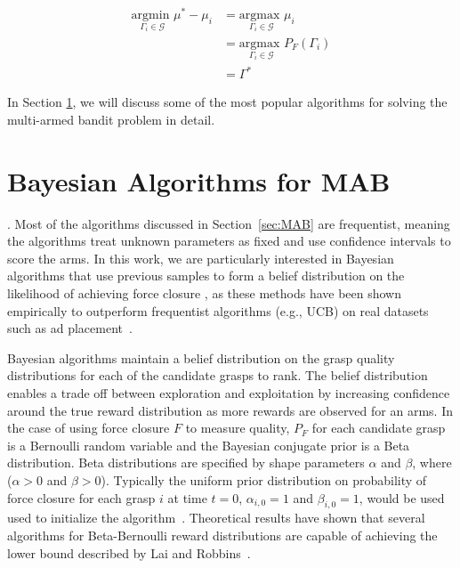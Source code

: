 \documentclass[journal,transmag]{IEEEtran}%
\newcommand{\mG}{\mathcal{G}}
\begin{document}
\vspace{-2ex}
\begin{align*}
	\underset{\Gamma_i \in \mG}{\text{argmin }}\mu^{*} - \mu_{i} &= \underset{\Gamma_i \in \mG}{\text{argmax }}\mu_{i} \\
	&=  \underset{\Gamma_i \in \mG}{\text{argmax }} P_F(\Gamma_i) \\
	&= \Gamma^{*}
\end{align*}

In Section \ref{sec:bandit_algorithm}, we will discuss some of the most popular algorithms for solving the multi-armed bandit problem in detail. 

\section{Bayesian Algorithms for MAB}\label{sec:bandit_algorithm}

.
Most of the algorithms discussed in Section~\ref{sec:MAB} are frequentist, meaning the algorithms treat unknown parameters as fixed and use confidence intervals to score the arms. 
In this work, we are particularly interested in Bayesian algorithms that use previous samples to form a belief distribution on the likelihood of achieving force closure \cite{weber1992gittins,agrawal2011analysis}, as these methods have been shown empirically to outperform frequentist algorithms (e.g., UCB) on real datasets such as ad placement~\cite{chapelle2011empirical, bachman2013greedy}.

Bayesian algorithms maintain a belief distribution on the grasp quality distributions for each of the candidate grasps to rank.
The belief distribution enables a trade off between exploration and exploitation by increasing confidence around the true reward distribution as more rewards are observed for an arms.
In the case of using force closure $F$ to measure quality, $P_F$ for each candidate grasp is a Bernoulli random variable and the Bayesian conjugate prior is a Beta distribution. 
Beta distributions are specified by shape parameters $\alpha$ and $\beta$, where ($\alpha >0$ and $\beta >0$).
Typically the uniform prior distribution on probability of force closure for each grasp $i$ at time $t = 0$, $\alpha_{i, 0} =1 $ and $\beta_{i, 0} = 1$, would be used used to initialize the algorithm~\cite{}. 
Theoretical results have shown that several algorithms for Beta-Bernoulli reward distributions are capable of achieving the lower bound described by Lai and Robbins~\cite{gittins1983dynamic, agrawal2011analysis, kaufmann2012bayesian}.
\end{document}
